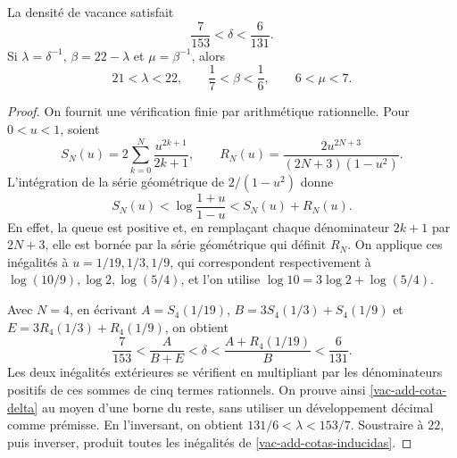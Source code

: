 \begin{lemma}
\label{vac-add-cotas}
La densité de vacance satisfait
\begin{equation}
 \frac7{153}<\delta<\frac6{131}.
 \label{vac-add-cota-delta}
\end{equation}
Si \(\lambda=\delta^{-1}\), \(\beta=22-\lambda\) et
\(\mu=\beta^{-1}\), alors
\begin{equation}
 21<\lambda<22,
 \qquad \frac17<\beta<\frac16,
 \qquad 6<\mu<7.
 \label{vac-add-cotas-inducidas}
\end{equation}
\end{lemma}
\begin{proof}
On fournit une vérification finie par arithmétique rationnelle. Pour \(0<u<1\), soient
\[
 S_N(u)=2\sum_{k=0}^{N}\frac{u^{2k+1}}{2k+1},
 \qquad
 R_N(u)=\frac{2u^{2N+3}}{(2N+3)(1-u^2)}.
\]
L'intégration de la série géométrique de \(2/(1-u^2)\) donne
\[
 S_N(u)<\log\frac{1+u}{1-u}<S_N(u)+R_N(u).
\]
En effet, la queue est positive et, en remplaçant chaque dénominateur
\(2k+1\) par \(2N+3\), elle est bornée par la série géométrique qui
définit \(R_N\). On applique ces inégalités à
\(u=1/19,1/3,1/9\), qui correspondent respectivement à
\(\log(10/9),\log2,\log(5/4)\), et l'on utilise
\(\log10=3\log2+\log(5/4)\).

Avec \(N=4\), en écrivant \(A=S_4(1/19)\), \(B=3S_4(1/3)+S_4(1/9)\) et \(E=3R_4(1/3)+R_4(1/9)\), on obtient
\[
 \frac7{153}
 <\frac{A}{B+E}
 <\delta
 <\frac{A+R_4(1/19)}{B}
 <\frac6{131}.
\]
Les deux inégalités extérieures se vérifient en multipliant par les
dénominateurs positifs de ces sommes de cinq termes rationnels.
On prouve ainsi \eqref{vac-add-cota-delta} au moyen d'une borne du reste,
sans utiliser un développement décimal comme prémisse. En l'inversant, on obtient
\(131/6<\lambda<153/7\). Soustraire à \(22\), puis inverser,
produit toutes les inégalités de \eqref{vac-add-cotas-inducidas}.
\end{proof}

